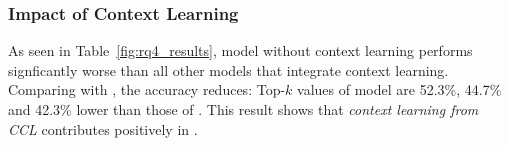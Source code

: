 %			





\subsubsection{\bf Impact of Context Learning}

As seen in Table~\ref{fig:rq4_results},  model
without context learning performs signficantly worse than all other
models that integrate context learning. Comparing with {\tool}, the
accuracy reduces: Top-$k$ values of  model are
52.3\%, 44.7\% and 42.3\% lower than those of {\tool}. This result
shows that {\em context learning from CCL} contributes positively in
{\tool}.

%



